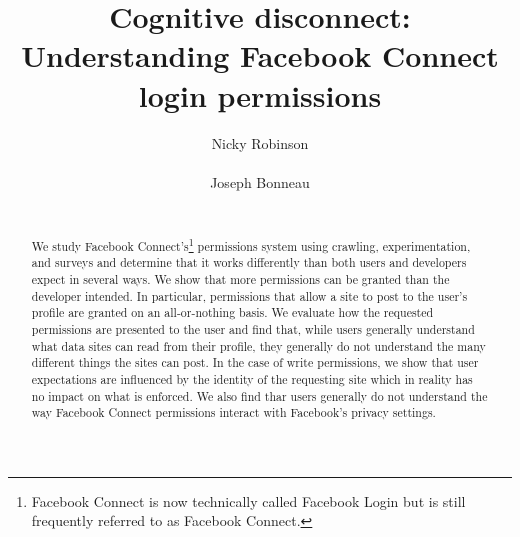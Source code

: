 \documentclass[10pt]{sig-alternate-10pt}
\begin{document}
\sloppy



\title{Cognitive disconnect:\\ Understanding Facebook Connect login permissions}

\author{
\alignauthor
Nicky Robinson\\
       \\
\alignauthor
Joseph Bonneau\\
       \\
}

\maketitle

\begin{abstract}
We study Facebook Connect's\footnote{Facebook Connect is now technically called Facebook Login but is still frequently referred to as Facebook Connect.} permissions system using crawling, experimentation, and surveys and determine that it works differently than both users and developers expect in several ways.
We show that more permissions can be granted than the developer intended.
In particular, permissions that allow a site to post to the user's profile are granted on an all-or-nothing basis.
We evaluate how the requested permissions are presented to the user and find that, while users generally understand what data sites can read from their profile, they generally do not understand the many different things the sites can post.
In the case of write permissions, we show that user expectations are influenced by the identity of the requesting site which in reality has no impact on what is enforced.
We also find thar users generally do not understand the way Facebook Connect permissions interact with Facebook's privacy settings.

\end{abstract}

\end{document}
